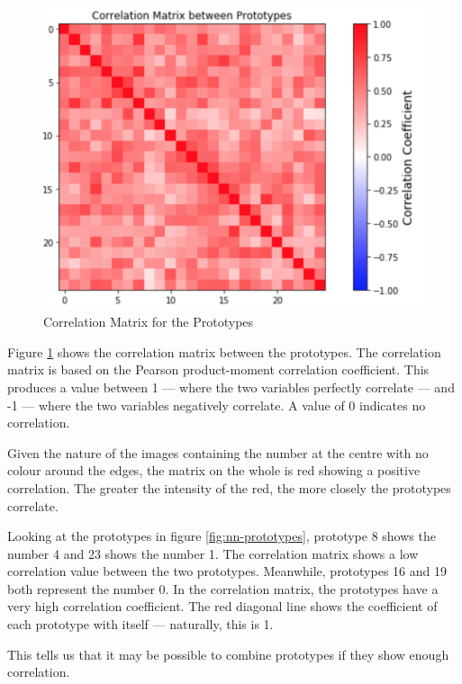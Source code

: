\documentclass[11pt,journal,transmag,final]{IEEEtran}
\begin{document}
\begin{figure}
    \begin{center}
        \includegraphics[width=\linewidth,keepaspectratio]{figures/nn-correlation.png}
        \caption{Correlation Matrix for the Prototypes}
        \label{fig:nn-correlation}
    \end{center}
\end{figure}

Figure \ref{fig:nn-correlation} shows the correlation matrix between the prototypes. The correlation matrix is based on the Pearson product-moment correlation coefficient. This produces a value between 1 --- where the two variables perfectly correlate --- and -1 --- where the two variables negatively correlate. A value of 0 indicates no correlation.

Given the nature of the images containing the number at the centre with no colour around the edges, the matrix on the whole is red showing a positive correlation. The greater the intensity of the red, the more closely the prototypes correlate.

Looking at the prototypes in figure \ref{fig:nn-prototypes}, prototype 8 shows the number 4 and 23 shows the number 1. The correlation matrix shows a low correlation value between the two prototypes. Meanwhile, prototypes 16 and 19 both represent the number 0. In the correlation matrix, the prototypes have a very high correlation coefficient. The red diagonal line shows the coefficient of each prototype with itself --- naturally, this is 1.

This tells us that it may be possible to combine prototypes if they show enough correlation.
\end{document}
